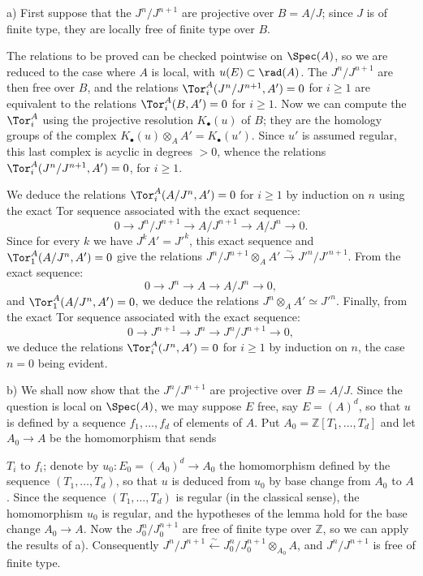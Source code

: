 a) First suppose that the $J^n/J^{n+1}$ are projective over $B=A/J$; since $J$ is of finite type, they are locally free of finite type over $B$.

%
The relations to be proved can be checked pointwise on $\Spec(A)$, so we are reduced to the case where $A$ is local, with $u(E)\subset\rad(A)$. The $J^n/J^{n+1}$ are then free over $B$, and the relations $\Tor_i^A(J^n/J^{n+1},A')=0$ for $i\geq1$ are equivalent to the relations $\Tor_i^A(B,A')=0$ for $i\geq1$. Now we can compute the $\Tor_i^A$ using the projective resolution $K_\bullet(u)$ of $B$; they are the homology groups of the complex $K_\bullet(u)\otimes_AA'=K_\bullet(u')$. Since $u'$ is assumed regular, this last complex is acyclic in degrees $>0$, whence the relations $\Tor_i^A(J^n/J^{n+1},A')=0$, for $i\geq1$.

We deduce the relations $\Tor_i^A(A/J^n,A')=0$ for $i\geq1$ by induction on $n$ using the exact Tor sequence associated with the exact sequence:
\[
 0\longrightarrow J^n/J^{n+1}\longrightarrow A/J^{n+1}\longrightarrow A/J^n\longrightarrow0.
\]
Since for every $k$ we have $J^kA'=J'^k$, this exact sequence and $\Tor_1^A(A/J^n,A')=0$ give the relations $J^n/J^{n+1}\otimes_AA'\xrightarrow{\sim}J'^n/J'^{n+1}$. From the exact sequence:
\[
 0\longrightarrow J^n\longrightarrow A\longrightarrow A/J^n\longrightarrow0,
\]
and $\Tor_1^A(A/J^n,A')=0$, we deduce the relations $J^n\otimes_AA'\simeq J'^n$. Finally, from the exact Tor sequence associated with the exact sequence:
\[
 0\longrightarrow J^{n+1}\longrightarrow J^n\longrightarrow J^n/J^{n+1}\longrightarrow0,
\]
we deduce the relations $\Tor_i^A(J^n,A')=0$ for $i\geq1$ by induction on $n$, the case $n=0$ being evident.

b) We shall now show that the $J^n/J^{n+1}$ are projective over $B=A/J$. Since the question is local on $\Spec(A)$, we may suppose $E$ free, say $E=(A)^d$, so that $u$ is defined by a sequence $f_1,\ldots,f_d$ of elements of $A$. Put $A_0=\mathbb Z[T_1,\ldots,T_d]$ and let $A_0\longrightarrow A$ be the homomorphism that sends

%
$T_i$ to $f_i$; denote by $u_0:E_0=(A_0)^d\longrightarrow A_0$ the homomorphism defined by the sequence $(T_1,\ldots,T_d)$, so that $u$ is deduced from $u_0$ by base change from $A_0$ to $A$. Since the sequence $(T_1,\ldots,T_d)$ is regular (in the classical sense), the homomorphism $u_0$ is regular, and the hypotheses of the lemma hold for the base change $A_0\longrightarrow A$. Now the $J_0^n/J_0^{n+1}$ are free of finite type over $\mathbb Z$, so we can apply the results of a). Consequently $J^n/J^{n+1}\xleftarrow{\sim}J_0^n/J_0^{n+1}\otimes_{A_0}A$, and $J^n/J^{n+1}$ is free of finite type.

